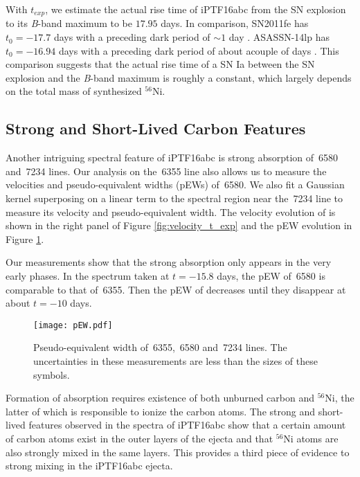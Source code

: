 \documentclass[twocolumn]{aastex61}
\begin{document}
With $t_{exp}$, we estimate the actual rise time of iPTF16abc from the
SN explosion to its \textit{B}-band maximum to be $17.95$ days.  In
comparison, SN2011fe has $t_0=-17.7$ days \citep{2013A&A...554A..27P}
with a preceding dark period of $\sim 1$ day
\citep{2014ApJ...784...85P}. ASASSN-14lp has $t_0=-16.94$ days with a
preceding dark period of about acouple of days
\citep{2016ApJ...826..144S}. This comparison suggests that the actual
rise time of a SN Ia between the SN explosion and the \textit{B}-band
maximum is roughly a constant, which largely depends on the total mass
of synthesized $^{56}$Ni.

\subsection{Strong and Short-Lived Carbon Features}
\label{sec:carbon}

Another intriguing spectral feature of iPTF16abc is strong absorption of
\,6580 and \,7234 lines. Our analysis on the
\,6355 line also allows us to measure the velocities and
pseudo-equivalent widths (pEWs) of \,6580. We also fit a Gaussian
kernel superposing on a linear term to the spectral region near
the \,7234 line to measure its velocity and pseudo-equivalent
width. The velocity evolution of  is shown in the right panel
of Figure \ref{fig:velocity_t_exp} and the pEW evolution
in Figure \ref{fig:ew}.

Our measurements show that the strong  absorption
only appears in the very early phases. In the spectrum taken at
$t=-15.8$ days, the pEW of \,6580 is comparable to that
of \,6355. Then the pEW of  decreases
until they disappear at about $t=-10$ days.

\begin{figure}[!htb]
  \centering
  \texttt{[image: pEW.pdf]}
  \caption{Pseudo-equivalent width of \,6355,
    \,6580 and \,7234 lines. The uncertainties
    in these measurements are less than the sizes of these symbols.}
  \label{fig:ew}
\end{figure}

Formation of  absorption requires existence of both unburned
carbon and $^{56}$Ni, the latter of which is responsible to ionize the
carbon atoms. The strong and short-lived  features observed
in the spectra of iPTF16abc show that a certain amount of carbon atoms
exist in the outer layers of the ejecta and that $^{56}$Ni atoms are also
strongly mixed in the same layers. This provides a third piece of evidence
to strong mixing in the iPTF16abc ejecta.
\end{document}
